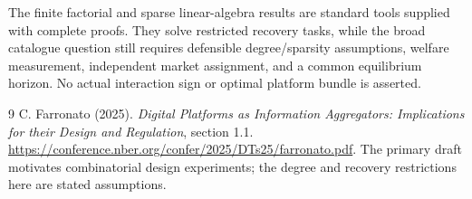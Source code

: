 \documentclass[11pt,a4paper]{article}
\begin{document}
The finite factorial and sparse linear-algebra results are standard tools supplied with complete proofs. They solve restricted recovery tasks, while the broad catalogue question still requires defensible degree/sparsity assumptions, welfare measurement, independent market assignment, and a common equilibrium horizon. No actual interaction sign or optimal platform bundle is asserted.
\begin{thebibliography}{9}
 C. Farronato (2025). \emph{Digital Platforms as Information Aggregators: Implications for their Design and Regulation}, section 1.1.
\url{https://conference.nber.org/confer/2025/DTs25/farronato.pdf}.
The primary draft motivates combinatorial design experiments; the degree and recovery restrictions here are stated assumptions.
\end{thebibliography}
\end{document}

